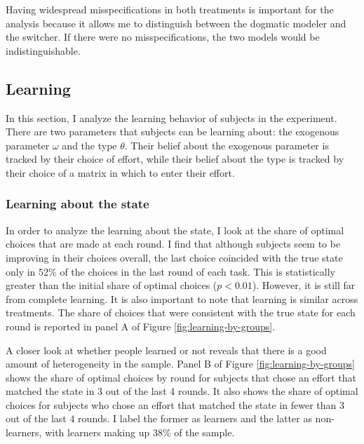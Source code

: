 \documentclass[
  12pt,
]{article}
\begin{document}
Having widespread misspecifications in both treatments is important for
the analysis because it allows me to distinguish between the dogmatic
modeler and the switcher. If there were no misspecifications, the two
models would be indistinguishable.

\hypertarget{learning}{%
\subsection{Learning}\label{learning}}

In this section, I analyze the learning behavior of subjects in the
experiment. There are two parameters that subjects can be learning
about: the exogenous parameter \(\omega\) and the type \(\theta\). Their
belief about the exogenous parameter is tracked by their choice of
effort, while their belief about the type is tracked by their choice of
a matrix in which to enter their effort.

\hypertarget{learning-about-the-state}{%
\subsubsection{Learning about the
state}\label{learning-about-the-state}}

In order to analyze the learning about the state, I look at the share of
optimal choices that are made at each round. I find that although
subjects seem to be improving in their choices overall, the last choice
coincided with the true state only in 52\% of the choices in the last
round of each task. This is statistically greater than the initial share
of optimal choices (\(p<0.01\)). However, it is still far from complete
learning. It is also important to note that learning is similar across
treatments. The share of choices that were consistent with the true
state for each round is reported in panel A of Figure
\ref{fig:learning-by-groups}.

A closer look at whether people learned or not reveals that there is a
good amount of heterogeneity in the sample. Panel B of Figure
\ref{fig:learning-by-groups} shows the share of optimal choices by round
for subjects that chose an effort that matched the state in 3 out of the
last 4 rounds. It also shows the share of optimal choices for subjects
who chose an effort that matched the state in fewer than 3 out of the
last 4 rounds. I label the former as learners and the latter as
non-learners, with learners making up 38\% of the sample.
\end{document}
